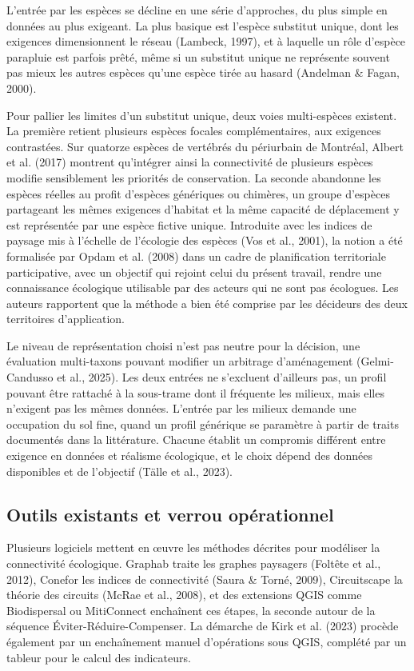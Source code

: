 \documentclass[a4paper,12pt]{report}
\begin{document}
L'entrée par les espèces se décline en une série d'approches, du plus simple en données au plus exigeant. La plus basique est l'espèce substitut unique, dont les exigences dimensionnent le réseau (Lambeck, 1997), et à laquelle un rôle d'espèce parapluie est parfois prêté, même si un substitut unique ne représente souvent pas mieux les autres espèces qu'une espèce tirée au hasard (Andelman \& Fagan, 2000).

Pour pallier les limites d'un substitut unique, deux voies multi-espèces existent. La première retient plusieurs espèces focales complémentaires, aux exigences contrastées. Sur quatorze espèces de vertébrés du périurbain de Montréal, Albert et al. (2017) montrent qu'intégrer ainsi la connectivité de plusieurs espèces modifie sensiblement les priorités de conservation. La seconde abandonne les espèces réelles au profit d'espèces génériques ou chimères, un groupe d'espèces partageant les mêmes exigences d'habitat et la même capacité de déplacement y est représentée par une espèce fictive unique. Introduite avec les indices de paysage mis à l'échelle de l'écologie des espèces (Vos et al., 2001), la notion a été formalisée par Opdam et al. (2008) dans un cadre de planification territoriale participative, avec un objectif qui rejoint celui du présent travail, rendre une connaissance écologique utilisable par des acteurs qui ne sont pas écologues. Les auteurs rapportent que la méthode a bien été comprise par les décideurs des deux territoires d'application.

Le niveau de représentation choisi n'est pas neutre pour la décision, une évaluation multi-taxons pouvant modifier un arbitrage d'aménagement (Gelmi-Candusso et al., 2025). Les deux entrées ne s'excluent d'ailleurs pas, un profil pouvant être rattaché à la sous-trame dont il fréquente les milieux, mais elles n'exigent pas les mêmes données. L'entrée par les milieux demande une occupation du sol fine, quand un profil générique se paramètre à partir de traits documentés dans la littérature. Chacune établit un compromis différent entre exigence en données et réalisme écologique, et le choix dépend des données disponibles et de l'objectif (Tälle et al., 2023).

\subsection{Outils existants et verrou opérationnel}
Plusieurs logiciels mettent en œuvre les méthodes décrites pour modéliser la connectivité écologique. Graphab traite les graphes paysagers (Foltête et al., 2012), Conefor les indices de connectivité (Saura \& Torné, 2009), Circuitscape la théorie des circuits (McRae et al., 2008), et des extensions QGIS comme Biodispersal ou MitiConnect enchaînent ces étapes, la seconde autour de la séquence Éviter-Réduire-Compenser. La démarche de Kirk et al. (2023) procède également par un enchaînement manuel d'opérations sous QGIS, complété par un tableur pour le calcul des indicateurs.
\end{document}
